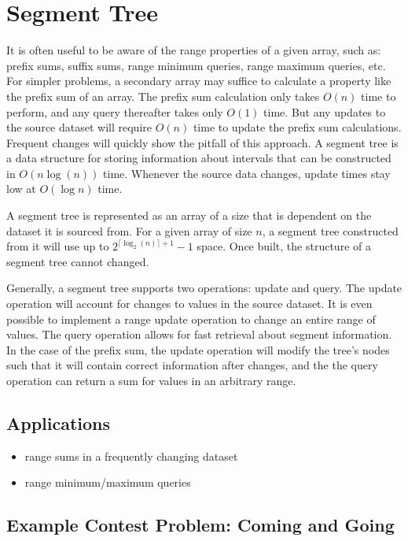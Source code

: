 \section{Segment Tree}

It is often useful to be aware of the range properties of a given array, such as: prefix sums, suffix sums, range minimum queries, range maximum queries, etc.
For simpler problems, a secondary array may suffice to calculate a property like the prefix sum of an array.
The prefix sum calculation only takes $O(n)$ time to perform, and any query thereafter takes only $O(1)$ time.
But any updates to the source dataset will require $O(n)$ time to update the prefix sum calculations.
Frequent changes will quickly show the pitfall of this approach.
A segment tree is a data structure for storing information about intervals that can be constructed in $O(n \log(n))$ time.
Whenever the source data changes, update times stay low at $O(\log n)$ time.

A segment tree is represented as an array of a size that is dependent on the dataset it is sourced from.
For a given array of size $n$, a segment tree constructed from it will use up to $2^{\lceil \log_2 (n)\rceil + 1} - 1$ space.
Once built, the structure of a segment tree cannot changed.

Generally, a segment tree supports two operations: update and query.
The update operation will account for changes to values in the source dataset.
It is even possible to implement a range update operation to change an entire range of values.
The query operation allows for fast retrieval about segment information.
In the case of the prefix sum, the update operation will modify the tree's nodes such that it will contain correct information after changes, and the the query operation can return a sum for values in an arbitrary range.

\subsection{Applications}

\begin{itemize}
    \item range sums in a frequently changing dataset
    \item range minimum/maximum queries
\end{itemize}

\subsection{Example Contest Problem: Coming and Going}

